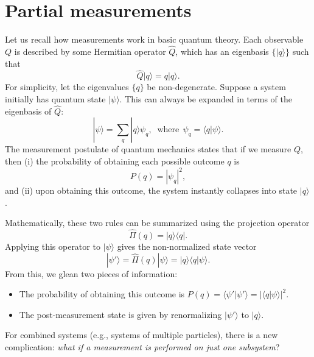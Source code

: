 \documentclass[pra,12pt]{revtex4-2}
\begin{document}
\section{Partial measurements}
\label{sec:partialmeasurements}

Let us recall how measurements work in basic quantum theory.  Each
observable $Q$ is described by some Hermitian operator $\hat{Q}$,
which has an eigenbasis $\{|q\rangle\}$ such that
\begin{equation}
  \hat{Q}|q\rangle = q |q\rangle.
\end{equation}
For simplicity, let the eigenvalues $\{q\}$ be non-degenerate.
Suppose a system initially has quantum state $|\psi\rangle$.  This can
always be expanded in terms of the eigenbasis of $\hat{Q}$:
\begin{equation}
  |\psi\rangle = \sum_q |q\rangle \psi_q, \;\;\mathrm{where}\;\, \psi_q = \langle q|\psi\rangle.
  \label{psiexpansion}
\end{equation}
The measurement postulate of quantum mechanics states that if we
measure $Q$, then (i) the probability of obtaining each possible
outcome $q$ is
\begin{equation}
  P(q) = |\psi_q|^2,
  \label{Pq}
\end{equation}
and (ii) upon obtaining this outcome, the system instantly
collapses into state $|q\rangle$.

Mathematically, these two rules can be summarized using the projection
operator
\begin{equation}
  \hat{\Pi}(q) = |q\rangle\langle q|.
  \label{project}
\end{equation}
Applying this operator to $|\psi\rangle$ gives the non-normalized
state vector
\begin{equation}
  |\psi'\rangle = \hat{\Pi}(q) |\psi\rangle = |q\rangle \langle q|\psi\rangle.
\end{equation}
From this, we glean two pieces of information:
\begin{itemize}
\item The probability of obtaining this outcome is
  $P(q) = \langle\psi'|\psi'\rangle = |\langle q|\psi\rangle|^2$.

\item The post-measurement state is given by renormalizing
  $|\psi'\rangle$ to $|q\rangle$.
\end{itemize}

For combined systems (e.g., systems of multiple particles), there is a
new complication: \textit{what if a measurement is performed on just
  one subsystem}?
\end{document}
